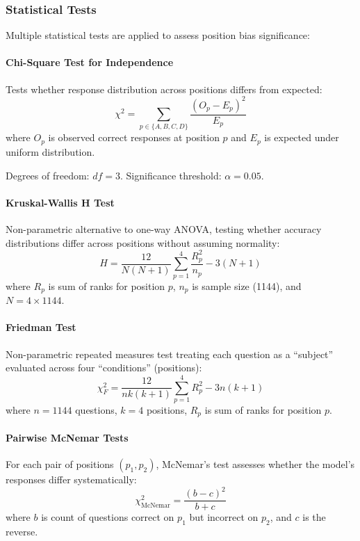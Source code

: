 \subsubsection{Statistical Tests}

Multiple statistical tests are applied to assess position bias significance:

\paragraph{Chi-Square Test for Independence}
Tests whether response distribution across positions differs from expected:
\begin{equation}
\chi^2 = \sum_{p \in \{A,B,C,D\}} \frac{(O_p - E_p)^2}{E_p}
\end{equation}
where $O_p$ is observed correct responses at position $p$ and $E_p$ is expected under uniform distribution.

Degrees of freedom: $df = 3$. Significance threshold: $\alpha = 0.05$.

\paragraph{Kruskal-Wallis H Test}
Non-parametric alternative to one-way ANOVA, testing whether accuracy distributions differ across positions without assuming normality:
\begin{equation}
H = \frac{12}{N(N+1)} \sum_{p=1}^{4} \frac{R_p^2}{n_p} - 3(N+1)
\end{equation}
where $R_p$ is sum of ranks for position $p$, $n_p$ is sample size (1144), and $N = 4 \times 1144$.

\paragraph{Friedman Test}
Non-parametric repeated measures test treating each question as a ``subject'' evaluated across four ``conditions'' (positions):
\begin{equation}
\chi_F^2 = \frac{12}{nk(k+1)} \sum_{p=1}^{4} R_p^2 - 3n(k+1)
\end{equation}
where $n = 1144$ questions, $k = 4$ positions, $R_p$ is sum of ranks for position $p$.

\paragraph{Pairwise McNemar Tests}
For each pair of positions $(p_1, p_2)$, McNemar's test assesses whether the model's responses differ systematically:
\begin{equation}
\chi^2_{\text{McNemar}} = \frac{(b - c)^2}{b + c}
\end{equation}
where $b$ is count of questions correct on $p_1$ but incorrect on $p_2$, and $c$ is the reverse.

